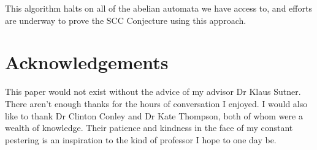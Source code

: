 \documentclass{article}
\newcommand{\2}{\textbf{2}}
\theoremstyle{definition}
\begin{document}
This algorithm halts on all of the abelian automata we have access to, and
efforts are underway to prove the SCC Conjecture using this approach.

\section*{Acknowledgements}
This paper would not exist without the advice of my advisor 
Dr Klaus Sutner. There aren't enough thanks for the hours of 
conversation I enjoyed. I would also like to thank 
Dr Clinton Conley and Dr Kate Thompson, both of whom were a wealth of
knowledge. Their patience and kindness in the face of my constant 
pestering is an inspiration to the kind of professor I hope to one day be.

\newpage



\end{document}
